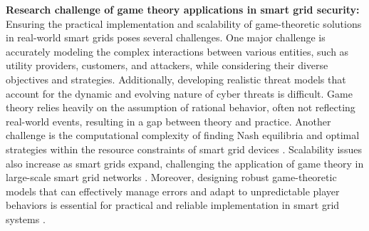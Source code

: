 \documentclass[10pt, journal]{IEEEtran}
\begin{document}




\textbf{Research challenge of game theory applications in smart grid security:}
Ensuring the practical implementation and scalability of game-theoretic solutions in real-world smart grids poses several challenges. One major challenge is accurately modeling the complex interactions between various entities, such as utility providers, customers, and attackers, while considering their diverse objectives and strategies. Additionally, developing realistic threat models that account for the dynamic and evolving nature of cyber threats is difficult. Game theory relies heavily on the assumption of rational behavior, often not reflecting real-world events, resulting in a gap between theory and practice. Another challenge is the computational complexity of finding Nash equilibria and optimal strategies within the resource constraints of smart grid devices \cite{fadlullah2011survey}. Scalability issues also increase as smart grids expand, challenging the application of game theory in large-scale smart grid networks \cite{ma2013scalable}. Moreover, designing robust game-theoretic models that can effectively manage errors and adapt to unpredictable player behaviors is essential for practical and reliable implementation in smart grid systems \cite{saad2012game}.
\end{document}
